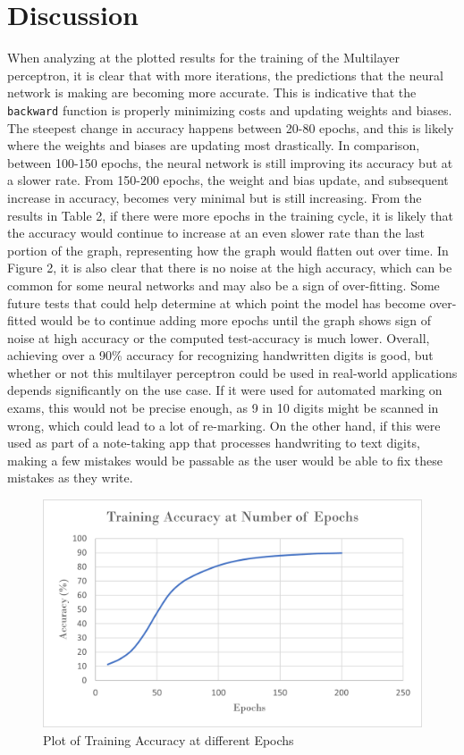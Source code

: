 \documentclass[twocolumn]{article}
\begin{document}
\section{Discussion}
When analyzing at the plotted results for the training of the Multilayer perceptron, it is clear that with more iterations, the predictions that the neural network is making are becoming more accurate. This is indicative that the \texttt{backward} function is properly minimizing costs and updating weights and biases. The steepest change in accuracy happens between 20-80 epochs, and this is likely where the weights and biases are updating most drastically. In comparison, between 100-150 epochs, the neural network is still improving its accuracy but at a slower rate. From 150-200 epochs, the weight and bias update, and subsequent increase in accuracy, becomes very minimal but is still increasing. From the results in Table 2, if there were more epochs in the training cycle, it is likely that the accuracy would continue to increase at an even slower rate than the last portion of the graph, representing how the graph would flatten out over time. In Figure 2, it is also clear that there is no noise at the high accuracy, which can be common for some neural networks and may also be a sign of over-fitting. Some future tests that could help determine at which point the model has become over-fitted would be to continue adding more epochs until the graph shows sign of noise at high accuracy or the computed test-accuracy is much lower. Overall, achieving over a 90\% accuracy for recognizing handwritten digits is good, but whether or not this multilayer perceptron could be used in real-world applications depends significantly on the use case. If it were used for automated marking on exams, this would not be precise enough, as 9 in 10 digits might be scanned in wrong, which could lead to a lot of re-marking. On the other hand, if this were used as part of a note-taking app that processes handwriting to text digits, making a few mistakes would be passable as the user would be able to fix these mistakes as they write. 
\begin{figure}[h!]
    \centering
    \includegraphics[width=0.95\linewidth]{accuracyvsepoch.png}
    \caption{Plot of Training Accuracy at different Epochs}
    \label{Plot of Training Accuracy at different Epochs}
\end{figure}
\end{document}
